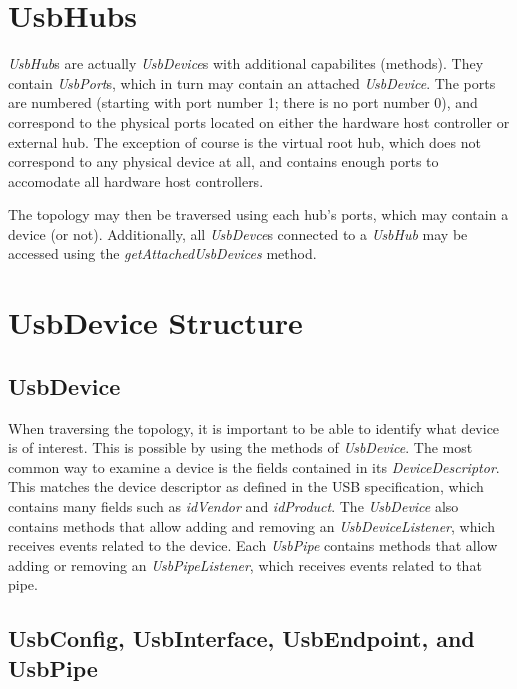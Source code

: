 \documentclass{article}
\newcommand{\myinterface}[1]{\emph{#1}}
\newcommand{\mymethod}[1]{\emph{#1}}
\begin{document}
%

\section{UsbHubs}

\myinterface{UsbHub}s are actually \myinterface{UsbDevice}s with additional capabilites (methods).
They contain \myinterface{UsbPort}s, which in turn may contain an attached \myinterface{UsbDevice}.
The ports are numbered (starting with port number 1; there is no port number 0), and
correspond to the physical ports located on either the hardware host controller or external hub.
The exception of course is the virtual root hub, which does not correspond to any physical device
at all, and contains enough ports to accomodate all hardware host controllers.

The topology may then be traversed using each hub's ports, which may contain a device (or not).
Additionally, all \myinterface{UsbDevce}s connected to a \myinterface{UsbHub} may be accessed using
the \mymethod{getAttachedUsbDevices} method.

%

\section{UsbDevice Structure}

\subsection{UsbDevice}

When traversing the topology, it is important to be able to identify what device is
of interest.  This is possible by using the methods of \myinterface{UsbDevice}.  The most
common way to examine a device is the fields contained in its \myinterface{DeviceDescriptor}.
This matches the device descriptor as defined in the USB specification, which contains
many fields such as \mymethod{idVendor} and \mymethod{idProduct}.  The \myinterface{UsbDevice}
also contains methods that allow adding and removing an \myinterface{UsbDeviceListener},
which receives events related to the device.  Each \myinterface{UsbPipe} contains methods
that allow adding or removing an \myinterface{UsbPipeListener}, which receives events
related to that pipe.

\subsection{UsbConfig, UsbInterface, UsbEndpoint, and UsbPipe}
\end{document}
